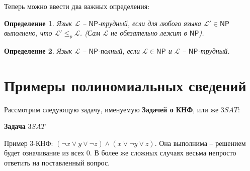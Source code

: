\documentclass[a4paper,12pt]{article}
\newtheorem{definition}{Определение}
\newcommand{\NPclass}{\mathsf{NP}}
\begin{document}
Теперь можно ввести два важных определения:
\begin{definition}
    Язык $\mathscr{L}$ -- $\NPclass$-трудный, если для любого языка $\mathscr{L}' \in \NPclass$ выполнено, что $\mathscr{L}' \leqslant_p \mathscr{L}$. (Сам $\mathscr{L}$ не обязательно лежит в $\NPclass$).
\end{definition}
\begin{definition}
    Язык $\mathscr{L}$ -- $\NPclass$-полный, если $\mathscr{L} \in \NPclass$ и $\mathscr{L}$ -- $\NPclass$-трудный.
\end{definition}
\newpage
\section{Примеры полиномиальных сведений}

Рассмотрим следующую задачу, именуемую \textbf{Задачей о КНФ}, или же $3SAT$:
\begin{algorithm}[H]
    \caption{\textbf{Задача} $3SAT$}
    \begin{algorithmic}
    \end{algorithmic}
\end{algorithm}
Пример 3-КНФ: $(\neg x \vee y \vee \neg z) \wedge (x \vee \neg y \vee z)$. Она выполнима -- решением будет означивание из всех 0. В более же сложных случаях весьма непросто ответить на поставленный вопрос.
\end{document}
